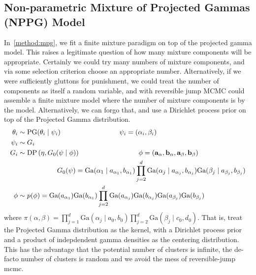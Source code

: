 \subsection{Non-parametric Mixture of Projected Gammas (NPPG) Model}
\label{method:nppg}
In~\ref{method:mpg}, we fit a finite mixture paradigm on top of the projected
gamma model.  This raises a legitimate question of how many mixture components
will be appropriate.  Certainly we could try many numbers of mixture components,
and via some selection criterion choose an appropriate number.  Alternatively, if
we were sufficiently gluttons for punishment, we could treat the number of
components as itself a random variable, and with reversible jump MCMC could
assemble a finite mixture model where the number of mixture components is
by the model.  Alternatively, we can forgo that, and use a Dirichlet process
prior on top of the Projected Gamma distribution.
\begin{equation}
  \label{eqn:nppg}
  \begin{aligned}
    \theta_i &\sim \text{PG}(\theta_i\mid \psi_i) \hspace{3cm}\psi_i = ({\bf \alpha}_i, {\bf \beta}_i)\\
    \psi_i &\sim G_i\\
    G_i &\sim \text{DP}\left(\eta, G_0(\psi\mid\phi)\right)\hspace{3cm}\phi = ({\bf a}_{\alpha}, {\bf b}_{\alpha}, {\bf a}_{\beta}, {\bf b}_{\beta})\\
    &\hspace{2cm}G_0(\psi) = \text{Ga}(\alpha_1\mid a_{\alpha_1},b_{\alpha_1})\prod_{j = 2}^d\text{Ga}(\alpha_j\mid a_{\alpha_j}, b_{\alpha_j})\text{Ga}(\beta_j\mid a_{\beta_j}, b_{\beta_j})\\
    \phi &\sim p(\phi) = \text{Ga}(a_{\alpha_1})\text{Ga}(b_{\alpha_1})\prod_{j = 2}^d\text{Ga}(a_{\alpha_j})\text{Ga}(b_{\alpha_j})\text{Ga}(a_{\beta_j})\text{Ga}(b_{\beta_j})\\
  \end{aligned}
\end{equation}
where $\pi(\alpha,\beta) = \prod_{j = 1}^d\text{Ga}(\alpha_j\mid a_0,b_0)\prod_{j = 2}^d\text{Ga}(\beta_j\mid c_0,d_0)$.
  That is, treat the Projected Gamma distribution as the kernel, with a
  Dirichlet process prior and a product of indepdendent gamma densities as the
  centering distribution.  This has the advantage that the potential number of
  clusters is infinite, the de-facto number of clusters is random and we avoid
  the mess of reversible-jump mcmc.

